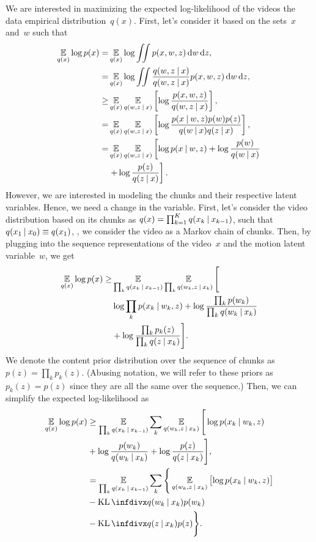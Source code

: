 We are interested in maximizing the expected log-likelihood of the videos \wrt the data empirical distribution~$q(x)$.  
First, let's consider it based on the sets~$x$ and~$w$ such that
\begin{align}
\E_{q(x)} \log p(x) =& \E_{q(x)} \log\iint p(x, w, z) \dif w \dif z, \\
=& \E_{q(x)} \log\iint \frac{q(w, z \given x)}{q(w, z \given x)}p(x,w,z) \dif w \dif z, \\
\ge& \E_{q(x)}\E_{q(w, z \given x)} \left[\log\frac{p(x,w,z)}{q(w, z \given x)}\right], \\
=& \E_{q(x)}\E_{q(w, z \given x)} \left[\log\frac{p(x \given w,z)p(w)p(z)}{q(w \given x)q(z \given x)}\right], \\\nonumber
=& \E_{q(x)}\E_{q(w, z \given x)} \left[\log p(x \given w,z) + \log\frac{p(w)}{q(w \given x)} \right.\\
&\left.+ \log\frac{p(z)}{q(z \given x)}\right].
\end{align}
However, we are interested in modeling the chunks and their respective latent variables.
Hence, we need a change in the variable.
First, let's consider the video distribution based on its chunks as $q(x) = \prod_{k=1}^K q(x_k \:\lvert\: x_{k-1})$, such that $q(x_1 \:\lvert\: x_0) \equiv q(x_1)$, \ie, we consider the video as a Markov chain of chunks.
Then, by plugging into the sequence representations of the video~$x$ and the motion latent variable~$w$, we get
\begin{align}
\operatorname*{\mathbb{E}}_{q(x)} \log p(x) \geq& \operatorname*{\mathbb{E}}_{\prod_k q(x_k \:\lvert\: x_{k-1})} \operatorname*{\mathbb{E}}_{\prod_k q(w_k, z \:\lvert\: x_k)} \Bigg[ \nonumber\\
& \log  \prod_k p(x_k \:\lvert\: w_k, z) + \nonumber \log\frac{\prod_k p(w_k)}{\prod_k q(w_k \:\lvert\: x_k)} \nonumber\\
&+ \log\frac{\prod_k p_k(z)}{\prod_k q(z \:\lvert\: x_k)} \Bigg].
\end{align}
We denote the content prior distribution over the sequence of chunks as $p(z) = \prod_k p_k(z)$.
(Abusing notation, we will refer to these priors as $p_k(z) = p(z)$ since they are all the same over the sequence.)
Then, we can simplify the expected log-likelihood as
\begin{align}
\E_{q(x)} \log p(x) & \geq \E_{\prod_k q(x_k \given x_{k-1})} \sum_k \E_{ q(w_k, z \given x_k)} \Bigg[\log  p(x_k \given w_k, z) \nonumber\\
&+ \log\frac{p(w_k)}{q(w_k \given x_k)} + \log\frac{p(z)}{q(z \given x_k)} \Bigg], \\
& = \E_{\prod_k q(x_k \given x_{k-1})} \sum_k \Bigg\{ \E_{ q(w_k, z \given x_k) } \left[\log  p(x_k \given w_k, z) \right] \nonumber\\
&  - \kl{q(w_k \given x_k)}{p(w_k)} \nonumber\\
&- \kl{q(z \given x_k)}{p(z)} \Bigg\}.
\end{align}

